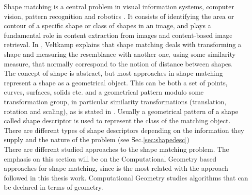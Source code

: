 Shape matching is a central problem in visual information systems,
computer vision, pattern recognition and robotics \cite{matchingbook}. 
It consists of identifying the area or contour of a specific
shape or class of shapes in an image, and plays a fundamental
role in content extraction from images and content-based image
retrieval. In \cite{matching2}, Veltkamp explains that shape 
matching deals with transforming a shape and measuring the 
resemblance with another one, using some similarity measure, that 
normally correspond to the notion of distance between shapes.\\
The concept of shape is abstract, but most approaches in 
shape matching represent a shape as a geometrical object.
This can be both a set of points, curves, surfaces, solids etc.
and a geometrical pattern modulo some transformation group,
in particular similarity transformations (translation, rotation 
and scaling), as is stated in \cite{matching2}. Usually a
geometrical pattern of a shape called shape descriptor
is used to represent the class of the matching object. There are
different types of shape descriptors depending on the information
they supply and the nature of the problem (see Sec.\ref{sec:shapedesc}) \\

There are different studied approaches to the shape matching 
problem. The emphasis on this section will be on the Computational
Geometry based approaches for shape matching, since is the most related with
the approach followed in this thesis work. Computational
Geometry studies algorithms that can be declared in terms of 
geometry.\\

